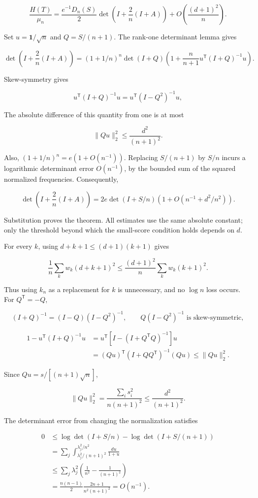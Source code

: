 \documentclass[11pt,a4paper]{article}
\begin{document}
\[
\frac{H(T)}{\mu_n}
=\frac{e^{-1}D_n(S)}2
\det\left(I+\frac2n(I+A)\right)
+O\left(\frac{(d+1)^2}{n}\right).
\]

Set \(u=\mathbf1/\sqrt n\) and \(Q=S/(n+1)\). The rank-one determinant lemma gives

\[
\det\left(I+\frac2n(I+A)\right)
=(1+1/n)^n\det(I+Q)
\left(1+\frac n{n+1}u^{\mathsf T}(I+Q)^{-1}u\right).
\]

Skew-symmetry gives

\[
u^{\mathsf T}(I+Q)^{-1}u=u^{\mathsf T}(I-Q^2)^{-1}u,
\]

The absolute difference of this quantity from one is at most

\[
\|Qu\|_2^2\le\frac{d^2}{(n+1)^2}.
\]

Also, \((1+1/n)^n=e(1+O(n^{-1}))\). Replacing \(S/(n+1)\) by \(S/n\) incurs a logarithmic determinant error \(O(n^{-1})\), by the bounded sum of the squared normalized frequencies. Consequently,

\[
\det\left(I+\frac2n(I+A)\right)
=2e\det(I+S/n)\left(1+O(n^{-1}+d^2/n^2)\right).
\]

Substitution proves the theorem. All estimates use the same absolute constant; only the threshold beyond which the small-score condition holds depends on \(d\).

For every \(k\), using \(d+k+1\le(d+1)(k+1)\) gives

\[
\frac1n\sum_kw_k(d+k+1)^2
\le\frac{(d+1)^2}{n}\sum_kw_k(k+1)^2.
\]

Thus using \(k_n\) as a replacement for \(k\) is unnecessary, and no \(\log n\) loss occurs. For \(Q^{\mathsf T}=-Q\),

\[
(I+Q)^{-1}=(I-Q)(I-Q^2)^{-1},\qquad
Q(I-Q^2)^{-1}\text{ is skew-symmetric},
\]

\[
\begin{aligned}
1-u^{\mathsf T}(I+Q)^{-1}u
&=u^{\mathsf T}[I-(I+Q^{\mathsf T}Q)^{-1}]u\\
&=(Qu)^{\mathsf T}(I+QQ^{\mathsf T})^{-1}(Qu)
\le\|Qu\|_2^2.
\end{aligned}
\]

Since \(Qu=s/[(n+1)\sqrt n]\),

\[
\|Qu\|_2^2=\frac{\sum_i s_i^2}{n(n+1)^2}\le\frac{d^2}{(n+1)^2}.
\]

The determinant error from changing the normalization satisfies

\[
\begin{aligned}
0&\le\log\det(I+S/n)-\log\det(I+S/(n+1))\\
&=\sum_j\int_{\lambda_j^2/(n+1)^2}^{\lambda_j^2/n^2}\frac{du}{1+u}\\
&\le\sum_j\lambda_j^2\left(\frac1{n^2}-\frac1{(n+1)^2}\right)\\
&=\frac{n(n-1)}2\frac{2n+1}{n^2(n+1)^2}=O(n^{-1}).
\end{aligned}
\]
\end{document}
